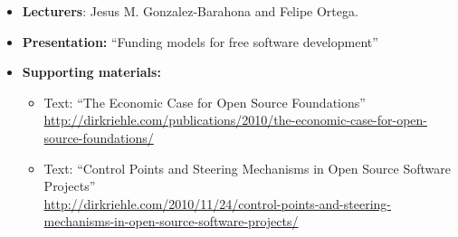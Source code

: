 \documentclass[a4paper]{article}
\begin{document}
\begin{itemize}
\item \textbf{Lecturers}: Jesus M. Gonzalez-Barahona and Felipe Ortega.
  
\item \textbf{Presentation:} ``Funding models for free software development''



\item \textbf{Supporting materials:} 
  \begin{itemize}
  \item Text: ``The Economic Case for Open Source Foundations''\\
    \url{http://dirkriehle.com/publications/2010/the-economic-case-for-open-source-foundations/}
  \item Text: ``Control Points and Steering Mechanisms in Open Source Software Projects''\\
    \url{http://dirkriehle.com/2010/11/24/control-points-and-steering-mechanisms-in-open-source-software-projects/} 
  \end{itemize}
\end{itemize}
\end{document}
